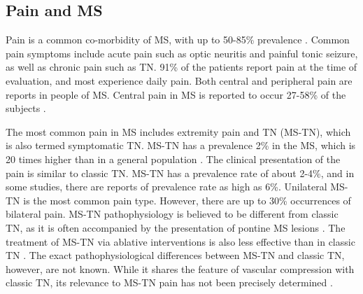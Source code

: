 \subsection{Pain and MS}
Pain is a common co-morbidity of MS, with up to 50-85\% prevalence \cite{Osterberg2005}. Common pain symptoms include acute pain such as optic neuritis and painful tonic seizure, as well as chronic pain such as TN. 91\% of the patients report pain at the time of evaluation, and most experience daily pain. Both central and peripheral pain are reports in people of MS. Central pain in MS is reported to occur 27-58\% of the subjects \cite{OConnor2008}. 

The most common pain in MS includes extremity pain and TN (MS-TN), which is also termed symptomatic TN. MS-TN has a prevalence 2\% in the MS, which is 20 times higher than in a general population \cite{Cruccu2009}. The clinical presentation of the pain is similar to classic TN. MS-TN has a prevalence rate of about 2-4\%, and in some studies, there are reports of prevalence rate as high as 6\%. Unilateral MS-TN is the most common pain type. However, there are up to 30\% occurrences of bilateral pain. MS-TN pathophysiology is believed to be different from classic TN, as it is often accompanied by the presentation of pontine MS lesions \cite{Cruccu2009}. The treatment of MS-TN via ablative interventions is also less effective than in classic TN \cite{Nurmikko2009}. The exact pathophysiological differences between MS-TN and classic TN, however, are not known. While it shares the feature of vascular compression with classic TN, its relevance to MS-TN pain has not been precisely determined \cite{Nurmikko2009}.